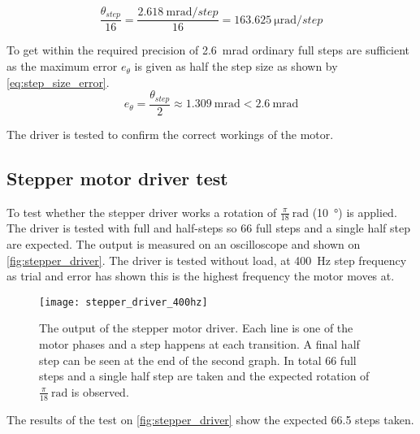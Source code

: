 \begin{equation}\label{Eq:smalleststep}
\frac{\theta_{step}}{16}=\frac{\SI{2.618}{\milli\radian\per step}}{16} = \SI{163,625}{\micro\radian\per step}
\end{equation}

To get within the required precision of \SI{2.6}{\milli\radian} ordinary full steps are sufficient as the maximum error $e_\theta$ is given as half the step size as shown by \autoref{eq:step_size_error}.
\begin{equation} \label{eq:step_size_error}
	e_\theta = \frac{\theta_{step}} {2} \approx \SI{1.309}{\milli\radian} < \SI{2.6}{\milli\radian}
\end{equation}
 
The driver is tested to confirm the correct workings of the motor.

\subsection{Stepper motor driver test}
To test whether the stepper driver works a rotation of $\frac{\pi}{18}~\si{\radian}$ (\SI{10}{\degree}) is applied. The driver is tested with full and half-steps so 66 full steps and a single half step are expected. The output is measured on an oscilloscope and shown on \autoref{fig:stepper_driver}. The driver is tested without load, at \SI{400}{\hertz} step frequency as trial and error has shown this is the highest frequency the motor moves at. 

\begin{figure}[h]
	\centering
	\texttt{[image: stepper\_driver\_400hz]}
	\caption{The output of the stepper motor driver. Each line is one of the motor phases and a step happens at each transition. A final half step can be seen at the end of the second graph. In total 66 full steps and a single half step are taken and the expected rotation of $\frac{\pi}{18}~\si{\radian}$ is observed.}
	\label{fig:stepper_driver}
\end{figure}

The results of the test on \autoref{fig:stepper_driver} show the expected 66.5 steps taken.

